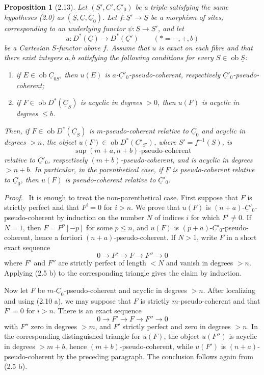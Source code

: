 \documentclass[13pt]{extarticle}
\newcommand{\uS}{\underline S}
\newcommand{\uC}{\underline C}
\newcommand{\ob}{\operatorname{ob}}
\newenvironment{prooftext}[1][Proof]{\par\noindent\emph{#1.}\ }{\par\medskip}
\newtheorem*{proposition*}{Proposition}
\begin{document}
\begin{proposition*}[2.13]
Let $(\uS',\uC',\uC'_0)$ be a triple satisfying the same hypotheses (2.0) as $(\uS,\uC,\uC_0)$. Let $f:\uS'\to\uS$ be a morphism of sites, corresponding to an underlying functor $\psi:\uS\to\uS'$, and let
\[
u:D^*(\uC)\longrightarrow D^*(\uC')\qquad (*=-,+,b)
\]
be a Cartesian $S$-functor above $f$. Assume that $u$ is exact on each fibre and that there exist integers $a,b$ satisfying the following conditions for every $S\in\ob\uS$:
\begin{enumerate}[label=(\roman*)]
\item if $E\in\ob\uC_{0S}$, then $u(E)$ is $a$-$\uC'_0$-pseudo-coherent, respectively $\uC'_0$-pseudo-coherent;
\item if $F\in\ob D^*(\uC_S)$ is acyclic in degrees $>0$, then $u(F)$ is acyclic in degrees $\leq b$.
\end{enumerate}
Then, if $F\in\ob D^*(\uC_S)$ is $m$-pseudo-coherent relative to $\uC_0$ and acyclic in degrees $>n$, the object $u(F)\in\ob D^*(\uC'_{S'})$, where $S'=f^{-1}(S)$, is
\[
\sup(m+a,n+b)\text{-pseudo-coherent}
\]
relative to $\uC'_0$, respectively $(m+b)$-pseudo-coherent, and is acyclic in degrees $>n+b$. In particular, in the parenthetical case, if $F$ is pseudo-coherent relative to $\uC_0$, then $u(F)$ is pseudo-coherent relative to $\uC'_0$.
\end{proposition*}

\begin{prooftext}
It is enough to treat the non-parenthetical case. First suppose that $F$ is strictly perfect and that $F^i=0$ for $i>n$. We prove that $u(F)$ is $(n+a)$-$\uC'_0$-pseudo-coherent by induction on the number $N$ of indices $i$ for which $F^i\ne0$. If $N=1$, then $F=F^p[-p]$ for some $p\leq n$, and $u(F)$ is $(p+a)$-$\uC'_0$-pseudo-coherent, hence a fortiori $(n+a)$-pseudo-coherent. If $N>1$, write $F$ in a short exact sequence
\[
0\longrightarrow F'\longrightarrow F\longrightarrow F''\longrightarrow0
\]
where $F'$ and $F''$ are strictly perfect of length $<N$ and vanish in degrees $>n$. Applying (2.5 b) to the corresponding triangle gives the claim by induction.

Now let $F$ be $m$-$\uC_0$-pseudo-coherent and acyclic in degrees $>n$. After localizing and using (2.10 a), we may suppose that $F$ is strictly $m$-pseudo-coherent and that $F^i=0$ for $i>n$. There is an exact sequence
\[
0\longrightarrow F'\longrightarrow F\longrightarrow F''\longrightarrow0
\]
with $F''$ zero in degrees $>m$, and $F'$ strictly perfect and zero in degrees $>n$. In the corresponding distinguished triangle for $u(F)$, the object $u(F'')$ is acyclic in degrees $>m+b$, hence $(m+b)$-pseudo-coherent, while $u(F')$ is $(n+a)$-pseudo-coherent by the preceding paragraph. The conclusion follows again from (2.5 b).
\end{prooftext}
\end{document}
